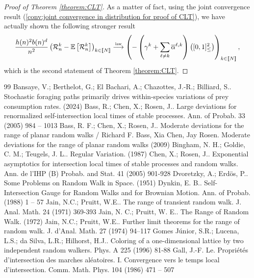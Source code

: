 \documentclass[10pt,a4paper]{amsart}
\newcommand{\R}{\mathcal R}
\newcommand{\EE}{\mathbb E}
\newcommand{\1}{\mathds{1}}
\newcommand{\distribution}{\stackrel{\scaleto{\mathrm{law}}{4pt}}{\longrightarrow}}
\numberwithin{equation}{section}
\begin{document}
\begin{proof}[Proof of Theorem \ref{theorem:CLT}]
    As a matter of fact, using the joint convergence result (\ref{conv:joint convergence in distribution for proof of CLT}), we have actually shown the following stronger result 
    \begin{equation*}
        \frac{h(n)^2b(n)^d}{n^2}\left(\mathcal R_n^k-\EE\left[\R_n^k\right]\right)_{k\in[\![N]\!]}\distribution\left(-\left(\gamma^k+\sum_{\ell\ne k}\overline\alpha^{\ell,k}\right)\left([0,1]_\le^2\right)\right)_{k\in[\![N]\!]},
    \end{equation*}
    which is the second statement of Theorem \ref{theorem:CLT}.
\end{proof}


\begin{thebibliography}{99}
 Bansaye, V.; Berthelot, G.; El Bachari, A.; Chazottes, J.-R.; Billiard, S.. Stochastic foraging paths primarily drives within-species variations of prey consumption rates. (2024)
 Bass, R.; Chen, X.; Rosen, J.. Large deviations for renormalized self-intersection local times of stable processes. Ann. of Probab. 33 (2005) 984 -- 1013
 Bass, R. F.; Chen, X.; Rosen, J.. Moderate deviations for the range of planar random walks / Richard F. Bass, Xia Chen, Jay Rosen. Moderate deviations for the range of planar random walks (2009)
 Bingham, N. H.; Goldie, C. M.; Teugels, J. L.. Regular Variation. (1987)
 Chen, X.; Rosen, J.. Exponential asymptotics for intersection local times of stable processes and random walks. Ann. de l'IHP (B) Probab. and Stat. 41 (2005) 901-928
 Dvoretzky, A.; Erd{\"o}s, P.. Some Problems on Random Walk in Space. (1951)
 Dynkin, E. B.. Self-Intersection Gauge for Random Walks and for Brownian Motion. Ann. of Probab. (1988) 1 -- 57
 Jain, N.C.; Pruitt, W.E.. The range of transient random walk. J. Anal. Math. 24 (1971) 369-393
 Jain, N. C.; Pruitt, W. E.. The Range of Random Walk. (1972)
 Jain, N.C.; Pruitt, W.E.. Further limit theorems for the range of random walk. J. d'Anal. Math. 27 (1974) 94--117
 Gomes Júnior, S.R.; Lucena, L.S.; {da Silva}, L.R.; Hilhorst, H.J.. Coloring of a one-dimensional lattice by two independent random walkers. Phys. A 225 (1996) 81-88
 Gall, J.-F. Le. Propriétés d'intersection des marches aléatoires. I. Convergence vers le temps local d'intersection. Comm. Math. Phys. 104 (1986) 471 -- 507

\end{thebibliography}
\end{document}
